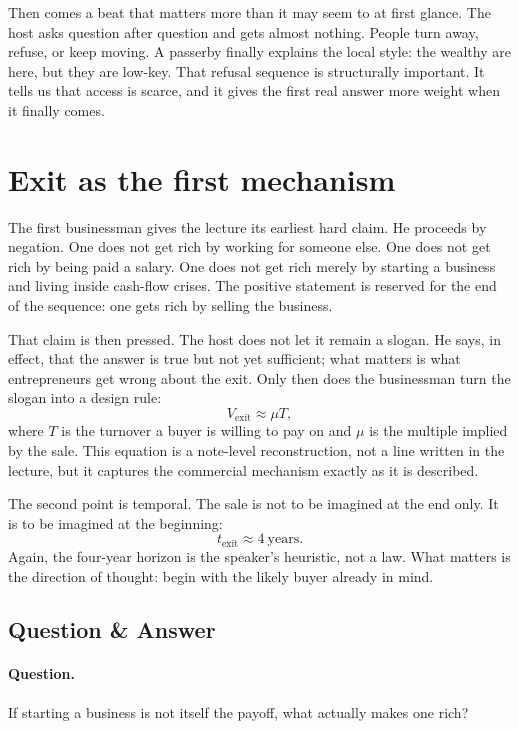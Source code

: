 Then comes a beat that matters more than it may seem to at first glance. The host asks question after question and gets almost nothing. People turn away, refuse, or keep moving. A passerby finally explains the local style: the wealthy are here, but they are low-key. That refusal sequence is structurally important. It tells us that access is scarce, and it gives the first real answer more weight when it finally comes.

\section{Exit as the first mechanism}

The first businessman gives the lecture its earliest hard claim. He proceeds by negation. One does not get rich by working for someone else. One does not get rich by being paid a salary. One does not get rich merely by starting a business and living inside cash-flow crises. The positive statement is reserved for the end of the sequence: one gets rich by selling the business.

That claim is then pressed. The host does not let it remain a slogan. He says, in effect, that the answer is true but not yet sufficient; what matters is what entrepreneurs get wrong about the exit. Only then does the businessman turn the slogan into a design rule:
\begin{equation}
V_{\mathrm{exit}} \approx \mu T,
\end{equation}
where \(T\) is the turnover a buyer is willing to pay on and \(\mu\) is the multiple implied by the sale. This equation is a note-level reconstruction, not a line written in the lecture, but it captures the commercial mechanism exactly as it is described.

The second point is temporal. The sale is not to be imagined at the end only. It is to be imagined at the beginning:
\begin{equation}
t_{\mathrm{exit}} \approx 4\ \text{years}.
\end{equation}
Again, the four-year horizon is the speaker's heuristic, not a law. What matters is the direction of thought: begin with the likely buyer already in mind.

\subsection{Question \& Answer}

\paragraph{Question.} If starting a business is not itself the payoff, what actually makes one rich?

